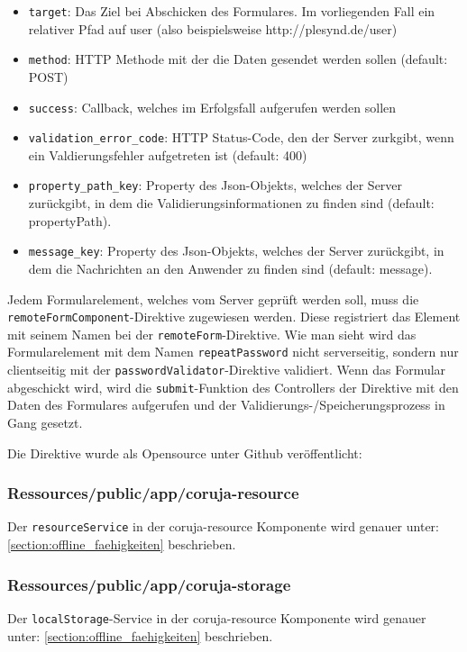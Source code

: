 \begin{itemize}
 \item \texttt{target}: Das Ziel bei Abschicken des Formulares. Im vorliegenden Fall ein relativer Pfad auf user (also beispielsweise http://plesynd.de/user)
 \item \texttt{method}: HTTP Methode mit der die Daten gesendet werden sollen (default: POST)
 \item \texttt{success}: Callback, welches im Erfolgsfall aufgerufen werden sollen
 \item \texttt{validation\_error\_code}: HTTP Status-Code, den der Server zurkgibt, wenn ein Valdierungsfehler aufgetreten ist (default: 400)
 \item \texttt{property\_path\_key}: Property des Json-Objekts, welches der Server zurückgibt, in dem die Validierungsinformationen zu finden sind (default: propertyPath).
 \item \texttt{message\_key}: Property des Json-Objekts, welches der Server zurückgibt, in dem die Nachrichten an den Anwender zu finden sind (default: message).
\end{itemize}
Jedem Formularelement, welches vom Server geprüft werden soll, muss die \texttt{remoteFormComponent}-Direktive zugewiesen werden. Diese registriert das Element mit seinem Namen bei der \texttt{remoteForm}-Direktive. Wie man sieht wird das Formularelement mit dem Namen \texttt{repeatPassword} nicht serverseitig, sondern nur clientseitig mit der \texttt{passwordValidator}-Direktive validiert. Wenn das Formular abgeschickt wird, wird die \texttt{submit}-Funktion des Controllers der Direktive mit den Daten des Formulares aufgerufen und der Validierungs-/Speicherungsprozess in Gang gesetzt.

Die Direktive wurde als Opensource unter Github veröffentlicht: 

\subsubsection*{Ressources/public/app/coruja-resource}
Der \texttt{resourceService} in der coruja-resource Komponente wird genauer unter: \ref{section:offline_faehigkeiten} beschrieben.

\subsubsection*{Ressources/public/app/coruja-storage}
Der \texttt{localStorage}-Service in der coruja-resource Komponente wird genauer unter: \ref{section:offline_faehigkeiten} beschrieben.


